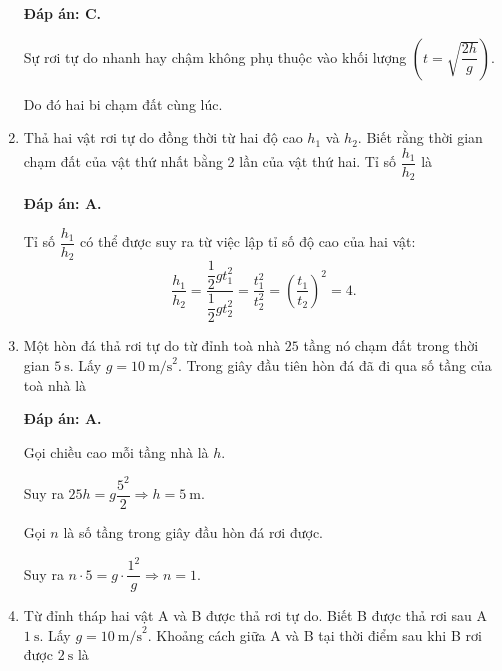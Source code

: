 \begin{enumerate}[label=\bfseries Câu \arabic*:]
{	}
	\hideall
	{	\textbf{Đáp án: C.}
		
		Sự rơi tự do nhanh hay chậm không phụ thuộc vào khối lượng $\left( t=\sqrt{\dfrac{2h}{g}}\right)$.
		
		Do đó hai bi chạm đất cùng lúc.
	}
	
	
	\item {}
	
	
	{Thả hai vật rơi tự do đồng thời từ hai độ cao $h_1$ và $h_2$. Biết rằng thời gian chạm đất của vật thứ nhất bằng 2 lần của vật thứ hai. Tỉ số $\dfrac{h_1}{h_2}$ là
	}
	\hideall
	{	\textbf{Đáp án: A.}
		
		Tỉ số $\dfrac{h_1}{h_2}$ có thể được suy ra từ việc lập tỉ số độ cao của hai vật: $$\dfrac{h_1}{h_2}=\dfrac{\dfrac{1}{2}gt_1^2}{\dfrac{1}{2}gt_2^2}=\dfrac{t_1^2}{t_2^2}=\left( \dfrac{t_1}{t_2}\right)^2=4.$$
	}
	
	\item {}
	
	
	{Một hòn đá thả rơi tự do từ đỉnh toà nhà $25$ tầng nó chạm đất trong thời gian $5\ \text{s}$. Lấy $g=10\ \text{m/s}^2$. Trong giây đầu tiên hòn đá đã đi qua số tầng của toà nhà là
	}
	\hideall
	{	\textbf{Đáp án: A.}
		
		Gọi chiều cao mỗi tầng nhà là $h$. 
		
		Suy ra $25h=g\dfrac{5^2}{2}\Rightarrow h=5\ \text{m}$.
		
		Gọi $n$ là số tầng trong giây đầu hòn đá rơi được.
		
		Suy ra $n\cdot 5=g\cdot \dfrac{1^2}{g}\Rightarrow n=1$.
	}
	\item {}
	
	
	{Từ đỉnh tháp hai vật A và B được thả rơi tự do. Biết B được thả rơi sau A $1\ \text{s}$. Lấy $g=10\ \text{m/s}^2$. Khoảng cách giữa A và B tại thời điểm sau khi B rơi được $2\ \text{s}$ là
		
}
\end{enumerate}
